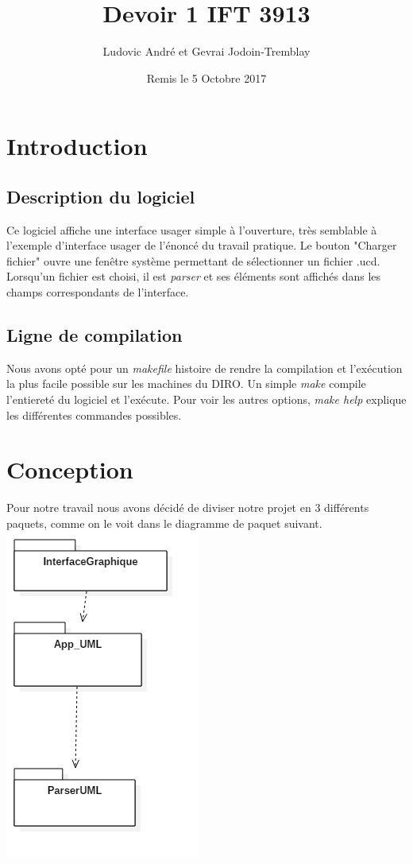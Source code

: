 \documentclass[letter,french]{report}
\begin{document}
\title{Devoir 1 IFT 3913}
\author{Ludovic André et Gevrai Jodoin-Tremblay}
\date{Remis le 5 Octobre 2017}
\maketitle

\section*{Introduction}

\subsection*{Description du logiciel}
Ce logiciel affiche une interface usager simple à l'ouverture, très semblable
à l'exemple d'interface usager de l'énoncé du travail pratique. Le bouton "Charger
fichier" ouvre une fenêtre système permettant de sélectionner un fichier .ucd.
Lorsqu'un fichier est choisi, il est \emph{parser} et ses éléments sont affichés dans
les champs correspondants de l'interface.

\subsection*{Ligne de compilation}
Nous avons opté pour un \emph{makefile} histoire de rendre la compilation et l'exécution
la plus facile possible sur les machines du DIRO. Un simple \emph{make} compile
l'entiereté du logiciel et l'exécute. Pour voir les autres options, \emph{make help}
explique les différentes commandes possibles.

\section*{Conception}
Pour notre travail nous avons décidé de diviser notre projet en 3 différents
paquets, comme on le voit dans le diagramme de paquet suivant.
\newline 
\includegraphics[scale=.3]{DiagrammePaquet.png}
\end{document}
